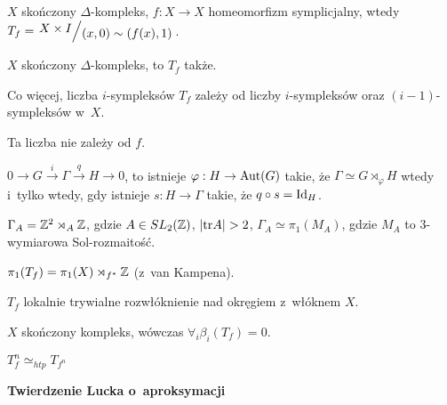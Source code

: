 

 


\begin{definicja}
	$X$ skończony $\Delta$-kompleks, 
	$f:X \to X$ homeomorfizm symplicjalny,
	wtedy $T_f = \bigslant{X \times I}{(x,0) \sim (f(x),1)}$.
\end{definicja}

\begin{uwaga}
	$X$ skończony $\Delta$-kompleks, to $T_f$ także.
	
	Co więcej, liczba $i$-sympleksów $T_f$ zależy 
	od liczby $i$-sympleksów oraz $(i-1)$-sympleksów w~$X$.
\end{uwaga}

\begin{stwierdzenie}
	Ta liczba nie zależy od $f$.
\end{stwierdzenie}

\begin{fakt}
	$0 \to G \xrightarrow i \Gamma \xrightarrow q H \to 0$,
	to istnieje ${\varphi:H \to {\mathrm{Aut}}(G)}$ takie, że
	${\Gamma \simeq G \rtimes_\varphi H}$ 
	wtedy i~tylko wtedy, gdy istnieje $s:H \to \Gamma$ 
	takie, że $q \circ s = {\mathrm{Id}}_H$.
\end{fakt}

\begin{przyklad}
	$\Gamma_A = {\mathbb{Z}}^2 \rtimes_A {\mathbb{Z}}$, gdzie $A \in SL_2({\mathbb{Z}})$, 
	$|{\mathrm{tr}} A| > 2$, $\Gamma_A \simeq \pi_1(M_A)$, gdzie
	$M_A$ to $3$-wymiarowa Sol-rozmaitość.
\end{przyklad}

\begin{fakt}
	$\pi_1(T_f) = \pi_1(X) \rtimes_{f^\ast} {\mathbb{Z}}$ (z~van Kampena).
\end{fakt}

\begin{uwaga}
	$T_f$ lokalnie trywialne rozwłóknienie nad okręgiem z~włóknem $X$.
\end{uwaga}

\begin{twierdzenie}[Luck]
	$X$ skończony kompleks, wówczas $\forall_i \beta_i(T_f) = 0$.
\end{twierdzenie}

\begin{lemat}
	$T_f^n \simeq_{htp} T_{f^n}$
\end{lemat}

{\bf Twierdzenie Lucka o~aproksymacji}

